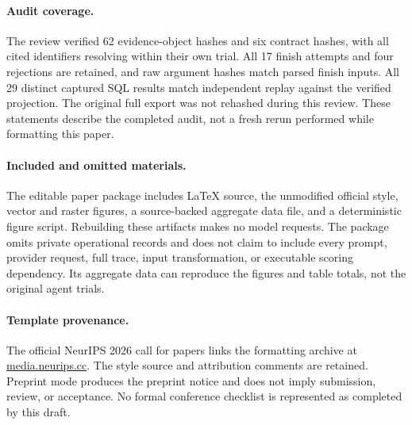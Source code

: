 \documentclass{article}
\begin{document}
\paragraph{Audit coverage.} The review verified 62 evidence-object hashes and six contract hashes, with all cited identifiers resolving within their own trial. All 17 finish attempts and four rejections are retained, and raw argument hashes match parsed finish inputs. All 29 distinct captured SQL results match independent replay against the verified projection. The original full export was not rehashed during this review. These statements describe the completed audit, not a fresh rerun performed while formatting this paper.

\paragraph{Included and omitted materials.} The editable paper package includes LaTeX source, the unmodified official style, vector and raster figures, a source-backed aggregate data file, and a deterministic figure script. Rebuilding these artifacts makes no model requests. The package omits private operational records and does not claim to include every prompt, provider request, full trace, input transformation, or executable scoring dependency. Its aggregate data can reproduce the figures and table totals, not the original agent trials.

\paragraph{Template provenance.} The official NeurIPS 2026 call for papers links the formatting archive at \href{https://media.neurips.cc/Conferences/NeurIPS2026/Formatting_Instructions_For_NeurIPS_2026.zip}{media.neurips.cc}. The style source and attribution comments are retained. Preprint mode produces the preprint notice and does not imply submission, review, or acceptance. No formal conference checklist is represented as completed by this draft.
\end{document}
